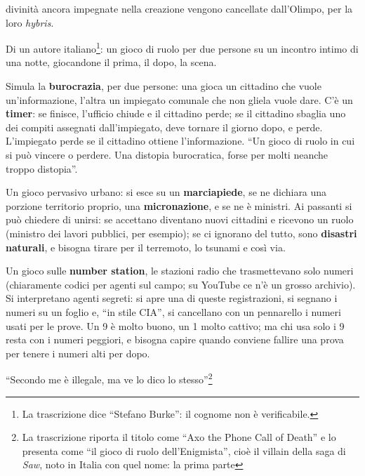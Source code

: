 \begin{description}
        divinità ancora impegnate nella creazione vengono cancellate dall'Olimpo, per
        la loro \emph{hybris}.
  \item[\emph{One Night Stand}.] Di un autore italiano\footnote{La trascrizione dice
        ``Stefano Burke'': il cognome non è verificabile.}: un gioco di ruolo per due
        persone su un incontro intimo di una notte, giocandone il prima, il dopo, la
        scena.
  \item[\emph{Paperwork}.] Simula la \textbf{burocrazia}, per due persone: una gioca
        un cittadino che vuole un'informazione, l'altra un impiegato comunale che non
        gliela vuole dare. C'è un \textbf{timer}: se finisce, l'ufficio chiude e il
        cittadino perde; se il cittadino sbaglia uno dei compiti assegnati
        dall'impiegato, deve tornare il giorno dopo, e perde. L'impiegato perde se il
        cittadino ottiene l'informazione. ``Un gioco di ruolo in cui si può vincere o
        perdere. Una distopia burocratica, forse per molti neanche troppo distopia''.
  \item[\emph{Sidewalker}.] Un gioco pervasivo urbano: si esce su un
        \textbf{marciapiede}, se ne dichiara una porzione territorio proprio, una
        \textbf{micronazione}, e se ne è ministri. Ai passanti si può chiedere di
        unirsi: se accettano diventano nuovi cittadini e ricevono un ruolo (ministro
        dei lavori pubblici, per esempio); se ci ignorano del tutto, sono
        \textbf{disastri naturali}, e bisogna tirare per il terremoto, lo tsunami e
        così via.
  \item[\emph{8525 kHz}.] Un gioco sulle \textbf{number station}, le stazioni radio
        che trasmettevano solo numeri (chiaramente codici per agenti sul campo; su
        YouTube ce n'è un grosso archivio). Si interpretano agenti segreti: si apre una
        di queste registrazioni, si segnano i numeri su un foglio e, ``in stile CIA'',
        si cancellano con un pennarello i numeri usati per le prove. Un 9 è molto
        buono, un 1 molto cattivo; ma chi usa solo i 9 resta con i numeri peggiori, e
        bisogna capire quando conviene fallire una prova per tenere i numeri alti per
        dopo.
  \item[\emph{The Phone Call of Death}.] ``Secondo me è illegale, ma ve lo dico lo
        stesso''\footnote{La trascrizione riporta il titolo come ``Axo the Phone Call
        of Death'' e lo presenta come ``il gioco di ruolo dell'Enigmista'', cioè il
        villain della saga di \emph{Saw}, noto in Italia con quel nome: la prima parte
}
\end{description}
